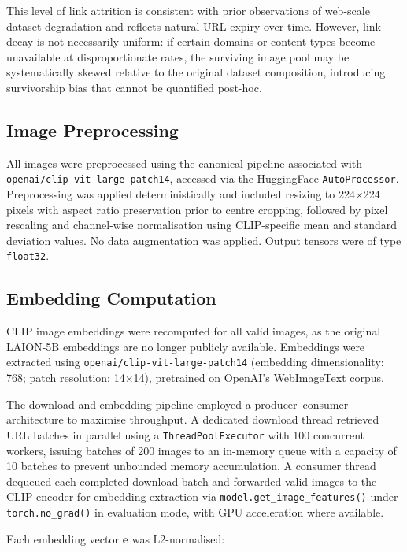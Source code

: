 This level of link attrition is consistent with prior observations of web-scale dataset degradation and reflects natural URL expiry over time. However, link decay is not necessarily uniform: if certain domains or content types become unavailable at disproportionate rates, the surviving image pool may be systematically skewed relative to the original dataset composition, introducing survivorship bias that cannot be quantified post-hoc.

\subsection{Image Preprocessing}

All images were preprocessed using the canonical pipeline associated with \texttt{openai/clip-vit-large-patch14}, accessed via the HuggingFace \texttt{AutoProcessor}. Preprocessing was applied deterministically and included resizing to 224$\times$224 pixels with aspect ratio preservation prior to centre cropping, followed by pixel rescaling and channel-wise normalisation using CLIP-specific mean and standard deviation values. No data augmentation was applied. Output tensors were of type \texttt{float32}.

\subsection{Embedding Computation}

CLIP image embeddings were recomputed for all valid images, as the original LAION-5B embeddings are no longer publicly available. Embeddings were extracted using \texttt{openai/clip-vit-large-patch14} (embedding dimensionality: 768; patch resolution: 14$\times$14), pretrained on OpenAI's WebImageText corpus.

The download and embedding pipeline employed a producer--consumer architecture to maximise throughput. A dedicated download thread retrieved URL batches in parallel using a \texttt{ThreadPoolExecutor} with 100 concurrent workers, issuing batches of 200 images to an in-memory queue with a capacity of 10 batches to prevent unbounded memory accumulation. A consumer thread dequeued each completed download batch and forwarded valid images to the CLIP encoder for embedding extraction via \texttt{model.get\_image\_features()} under \texttt{torch.no\_grad()} in evaluation mode, with GPU acceleration where available.

Each embedding vector $\mathbf{e}$ was L2-normalised:

